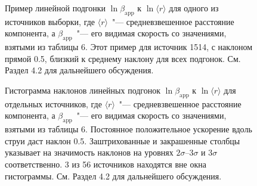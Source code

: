 \begin{figure}[]
 \caption{Пример линейной подгонки $\ln \beta_\text{app}$ к $\ln\langle{r}\rangle$ для одного из
источников выборки, где $\langle{r}\rangle$~"--- средневзвешенное расстояние компонента, а
$\beta_\text{app}$~"--- его видимая скорость со значениями, взятыми из таблицы 6. Этот пример для
источник 1514, с наклоном прямой 0.5, близкий к среднему наклону для всех
подгонок. См. Раздел 4.2 для дальнейшего обсуждения.}
 \label{fig:rdv_beta_app_vs_r}
\end{figure}

\begin{figure}[]
 \caption{Гистограмма наклонов линейных подгонок $\ln \beta_\text{app}$ к $\ln\langle{r}\rangle$ для
отдельных источников, где $\langle{r}\rangle$~"--- средневзвешенное расстояние компонента, а
$\beta_\text{app}$~"--- его видимая скорость со значениями, взятыми из таблицы 6. Постоянное
положительное ускорение вдоль струи даст наклон 0.5. Заштрихованные и закрашенные столбцы указывает
на значимость наклонов на уровнях $2\sigma$--$3\sigma$ и $3\sigma$ соответственно. 3 из 56
источников находятся вне окна гистограммы. См. Раздел 4.2 для дальнейшего обсуждения.}
 \label{fig:rdv_hist_beta_app_vs_r}
\end{figure}


